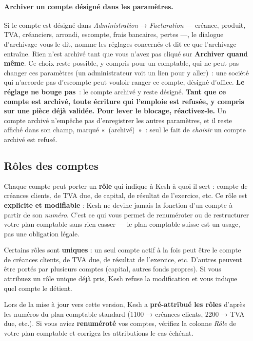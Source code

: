 \documentclass[a4paper,11pt,oneside]{article}
\begin{document}
\paragraph{Archiver un compte désigné dans les paramètres.} Si le compte est désigné dans \emph{Administration} → \emph{Facturation} --- créance, produit, TVA, créanciers, arrondi, escompte, frais bancaires, pertes ---, le dialogue d'archivage vous le dit, nomme les réglages concernés et dit ce que l'archivage entraîne. Rien n'est archivé tant que vous n'avez pas cliqué sur \textbf{Archiver quand même}. Ce choix reste possible, y compris pour un comptable, qui ne peut pas changer ces paramètres (un administrateur voit un lien pour y aller)~: une société qui n'accorde pas d'escompte peut vouloir ranger ce compte, désigné d'office. \textbf{Le réglage ne bouge pas}~: le compte archivé y reste désigné. \textbf{Tant que ce compte est archivé, toute écriture qui l'emploie est refusée, y compris sur une pièce déjà validée. Pour lever le blocage, réactivez-le.} Un compte archivé n'empêche pas d'enregistrer les autres paramètres, et il reste affiché dans son champ, marqué «~(archivé)~»~: seul le fait de \emph{choisir} un compte archivé est refusé.

\subsection{Rôles des comptes}

Chaque compte peut porter un \textbf{rôle} qui indique à Kesh à quoi il sert : compte de créances clients, de TVA due, de capital, de résultat de l'exercice, etc. Ce rôle est \textbf{explicite et modifiable} : Kesh ne devine jamais la fonction d'un compte à partir de son \emph{numéro}. C'est ce qui vous permet de renuméroter ou de restructurer votre plan comptable sans rien casser — le plan comptable suisse est un usage, pas une obligation légale.

Certains rôles sont \textbf{uniques} : un seul compte actif à la fois peut être le compte de créances clients, de TVA due, de résultat de l'exercice, etc. D'autres peuvent être portés par plusieurs comptes (capital, autres fonds propres). Si vous attribuez un rôle unique déjà pris, Kesh refuse la modification et vous indique quel compte le détient.

\begin{keshwarning}
Lors de la mise à jour vers cette version, Kesh a \textbf{pré-attribué les rôles} d'après les numéros du plan comptable standard (1100 → créances clients, 2200 → TVA due, etc.). Si vous aviez \textbf{renuméroté} vos comptes, vérifiez la colonne \emph{Rôle} de votre plan comptable et corrigez les attributions le cas échéant.
\end{keshwarning}
\end{document}
